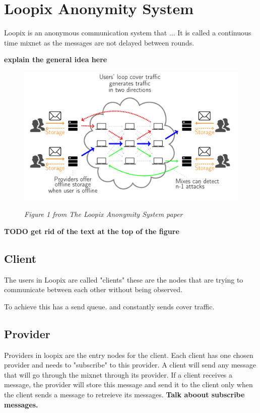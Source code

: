\documentclass[a4paper,11pt,oneside]{report}
\begin{document}
\section{Loopix Anonymity System}
Loopix is an anonymous communication system that ... It is called a continuous time mixnet as the messages are not delayed between rounds.

\textbf{explain the general idea here}

\begin{figure}[H]
    \centering
    \includegraphics[width=0.8\linewidth]{plots/loopix.png}
    \caption{}
    \label{fig:loopix}
    \small\textit{Figure 1 from The Loopix Anonymity System paper}
\end{figure}

\textbf{TODO get rid of the text at the top of the figure}
\subsection{Client}
The users in Loopix are called "clients" these are the nodes that are trying to communicate between each other without being observed.

To achieve this has a send queue. and constantly sends cover traffic.
\subsection{Provider}

Providers in loopix are the entry nodes for the client. Each client has one chosen provider and needs to "subscribe" to this provider. A client will send any message that will go through the mixnet through its provider. If a client receives a message, the provider will store this message and send it to the client only when the client sends a message to retreieve its messages.
\textbf{Talk aboout subscribe messages.}
\end{document}
